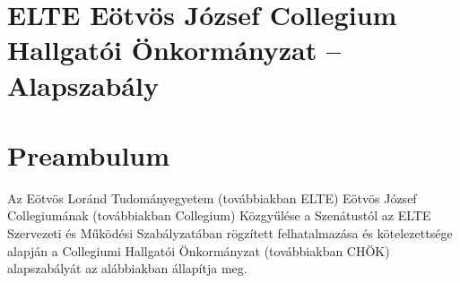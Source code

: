 \documentclass{rulebook}
\begin{document}
\section*{ELTE Eötvös József Collegium \\ \vspace{0.5em} Hallgatói Önkormányzat -- Alapszabály} 

\vspace{2em}


\section*{\normalfont Preambulum} 

Az Eötvös Loránd Tudományegyetem (továbbiakban ELTE) Eötvös József Collegiumának (továbbiakban Collegium) Közgyűlése a Szenátustól az ELTE Szervezeti és Működési Szabályzatában rögzített felhatalmazása és kötelezettsége alapján a Collegiumi Hallgatói Önkormányzat (továbbiakban CHÖK) alapszabályát az alábbiakban állapítja meg.
\end{document}
